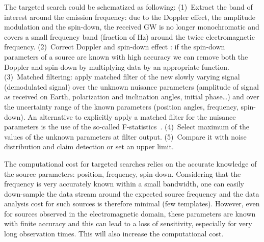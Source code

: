 The targeted search could be schematized as following: (1)~Extract the band of interest around the emission frequency: due to the Doppler effect, the amplitude modulation and the spin-down, the received GW is no longer monochromatic and covers a small  frequency band (fraction of Hz) around the twice electromagnetic frequency.  (2)~Correct Doppler and spin-down effect : if the spin-down parameters of a source are known with high accuracy we can remove both the Doppler and spin-down by multiplying data by an appropriate function. %
(3)~Matched filtering: apply matched filter of the new slowly varying signal (demodulated signal) over the unknown nuisance parameters (amplitude of signal as received on Earth, polarization and inclination angles, initial phase\dots) and over the uncertainty range of the known parameters (position angles, frequency, spin-down).  An alternative to explicitly apply a matched filter for the nuisance parameters is the use of the so-called F-statistics~\cite{ItohFStatistic}. (4)~Select maximum of the values of the unknown parameters at filter output. (5)~Compare it with noise distribution and claim detection or set an upper limit.  %

The computational cost for targeted searches relies on the accurate knowledge of the source parameters: position, frequency, spin-down.
Considering that the frequency is very accurately known within a small bandwidth, one can  easily down-sample the data stream around the expected source frequency and  the data analysis cost for such sources is therefore minimal (few templates). However, even for sources observed in the electromagnetic domain,  these parameters are known with finite accuracy and this can lead to a loss of sensitivity, especially for very long observation times. This will also  increase the computational cost. 

